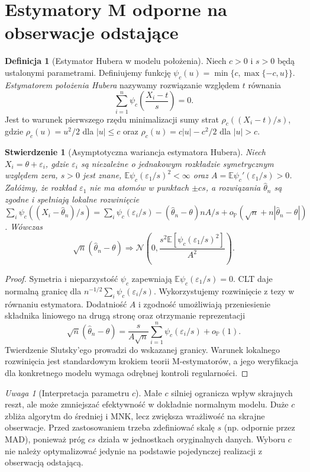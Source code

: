 \documentclass[11pt,a4paper,oneside]{report}
\numberwithin{equation}{chapter}
\theoremstyle{plain}
\newtheorem{stwierdzenie}[twierdzenie]{Stwierdzenie}
\theoremstyle{definition}
\newtheorem{definicja}{Definicja}[chapter]
\theoremstyle{remark}
\newtheorem{uwaga}{Uwaga}[chapter]
\newcommand{\Prob}{\mathbb P}
\newcommand{\E}{\mathbb E}
\newcommand{\Normal}{\mathcal N}
\begin{document}
\section{Estymatory M odporne na obserwacje odstające}
\begin{definicja}[Estymator Hubera w modelu położenia]
\label{def:huber}
Niech $c>0$ i $s>0$ będą ustalonymi parametrami.
Definiujemy funkcję
$\psi_c(u)=\min\{c,\max\{-c,u\}\}$.
\emph{Estymatorem położenia Hubera} nazywamy rozwiązanie
względem $t$ równania
\[
 \sum_{i=1}^n\psi_c\left(\frac{X_i-t}{s}\right)=0.
\]
Jest to warunek pierwszego rzędu minimalizacji
sumy strat $\rho_c((X_i-t)/s)$, gdzie
$\rho_c(u)=u^2/2$ dla $|u|\le c$ oraz
$\rho_c(u)=c|u|-c^2/2$ dla $|u|>c$.
\end{definicja}

\begin{stwierdzenie}[Asymptotyczna wariancja estymatora Hubera]
\label{prop:huber-asympt}
Niech $X_i=\theta+\varepsilon_i$, gdzie $\varepsilon_i$
są niezależne o jednakowym rozkładzie symetrycznym
względem zera, $s>0$ jest znane,
$\E\psi_c(\varepsilon_1/s)^2<\infty$ oraz
$A=\E\psi_c'(\varepsilon_1/s)>0$.
Załóżmy, że rozkład $\varepsilon_1$ nie ma atomów
w punktach $\pm cs$, a rozwiązania $\widehat\theta_n$
są zgodne i spełniają lokalne rozwinięcie
$\sum_i\psi_c((X_i-\widehat\theta_n)/s)
=\sum_i\psi_c(\varepsilon_i/s)
-(\widehat\theta_n-\theta) n A/s
+o_\Prob(\sqrt n+ n|\widehat\theta_n-\theta|)$.
Wówczas
\[
 \sqrt n(\widehat\theta_n-\theta)
 \Rightarrow\Normal\left(0,
 \frac{s^2\E[\psi_c(\varepsilon_1/s)^2]}{A^2}\right).
\]
\end{stwierdzenie}
\begin{proof}
Symetria i nieparzystość $\psi_c$ zapewniają
$\E\psi_c(\varepsilon_1/s)=0$.
CLT daje normalną granicę dla
$n^{-1/2}\sum_i\psi_c(\varepsilon_i/s)$.
Wykorzystujemy rozwinięcie z tezy w równaniu estymatora.
Dodatniość $A$ i zgodność umożliwiają przeniesienie
składnika liniowego na drugą stronę oraz otrzymanie
reprezentacji
\[
 \sqrt n(\widehat\theta_n-\theta)
 =\frac{s}{A\sqrt n}\sum_{i=1}^n
 \psi_c(\varepsilon_i/s)+o_\Prob(1).
\]
Twierdzenie Slutsky'ego prowadzi do wskazanej granicy.
Warunek lokalnego rozwinięcia jest standardowym krokiem
teorii M-estymatorów, a jego weryfikacja dla konkretnego
modelu wymaga odrębnej kontroli regularności.
\end{proof}

\begin{uwaga}[Interpretacja parametru $c$]
Małe $c$ silniej ogranicza wpływ skrajnych reszt,
ale może zmniejszać efektywność w dokładnie normalnym
modelu. Duże $c$ zbliża algorytm do średniej i MNK,
lecz zwiększa wrażliwość na skrajne obserwacje.
Przed zastosowaniem trzeba zdefiniować skalę $s$
(np. odpornie przez MAD), ponieważ próg $cs$ działa
w jednostkach oryginalnych danych. Wyboru $c$
nie należy optymalizować jedynie na podstawie
pojedynczej realizacji z obserwacją odstającą.
\end{uwaga}
\end{document}
